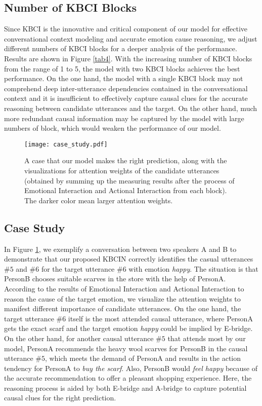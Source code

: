 \documentclass[letterpaper]{article} \usepackage{aaai23}  \usepackage{times}  \usepackage{helvet}  \usepackage{courier}  \usepackage[hyphens]{url}  \usepackage{graphicx} \urlstyle{rm} \def\UrlFont{\rm}  \usepackage{natbib}  \usepackage{caption} \frenchspacing  \setlength{\pdfpagewidth}{8.5in} \setlength{\pdfpageheight}{11in} \usepackage{algorithm}
\begin{document}
\subsection{Number of KBCI Blocks}
Since KBCI is the innovative and critical component of our model for effective conversational context modeling and accurate emotion cause reasoning, we adjust different numbers of KBCI blocks for a deeper analysis of the performance. Results are shown in Figure \ref{tab4}. With the increasing number of KBCI blocks from the range of 1 to 5, the model with two KBCI blocks achieves the best performance. On the one hand, the model with a single KBCI block may not comprehend deep inter-utterance dependencies contained in the conversational context and it is insufficient to effectively capture causal clues for the accurate reasoning between candidate utterances and the target. On the other hand, much more redundant causal information may be captured by the model with large numbers of block, which would weaken the performance of our model.

\begin{figure}[htbp]
\centering
\texttt{[image: case\_study.pdf]}
\caption{A case that our model makes the right prediction, along with the visualizations for attention weights of the candidate utterances (obtained by summing up the measuring results after the process of Emotional Interaction and Actional Interaction from each block). The darker color mean larger attention weights.}
\label{case_study}
\end{figure}

\subsection{Case Study}
In Figure \ref{case_study}, we exemplify a conversation between two speakers A and B to demonstrate that our proposed KBCIN correctly identifies the casual utterances $\#5$ and $\#6$ for the target utterance $\#6$ with emotion \emph{happy}. The situation is that PersonB chooses suitable scarves in the store with the help of PersonA. According to the results of Emotional Interaction and Actional Interaction to reason the cause of the target emotion, we visualize the attention weights to manifest different importance of candidate utterances. On the one hand, the target utterance $\#6$ itself is the most attended causal utterance, where PersonA gets the exact scarf and the target emotion \emph{happy} could be implied by E-bridge. On the other hand, for another causal utterance $\#5$ that attends most by our model, PersonA recommends the heavy wool scarves for PersonB in the causal utterance $\#5$, which meets the demand of PersonA and results in the action tendency for PersonA to \emph{buy the scarf}. Also, PersonB would \emph{feel happy} because of the accurate recommendation to offer a pleasant shopping experience. Here, the reasoning process is aided by both E-bridge and A-bridge to capture potential causal clues for the right prediction.
\end{document}
